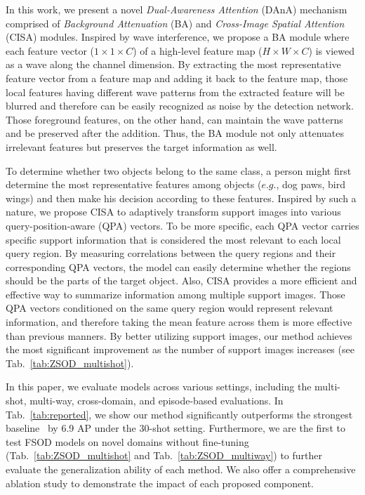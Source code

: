 \documentclass[journal]{IEEEtran}
\begin{document}
In this work, we present a novel \textit{Dual-Awareness Attention} (DAnA) mechanism comprised of \textit{Background Attenuation} (BA) and \textit{Cross-Image Spatial Attention} (CISA) modules.
Inspired by wave interference, we propose a BA module where each feature vector ($1\times 1\times C$) of a high-level feature map ($H\times W\times C$) is viewed as a wave along the channel dimension.
By extracting the most representative feature vector from a feature map and adding it back to the feature map, those local features having different wave patterns from the extracted feature will be blurred and therefore can be easily recognized as noise by the detection network. 
Those foreground features, on the other hand, can maintain the wave patterns and be preserved after the addition.
Thus, the BA module not only attenuates irrelevant features but preserves the target information as well.


To determine whether two objects belong to the same class, a person might first determine the most representative features among objects ($e.g.$, dog paws, bird wings) and then make his decision according to these features.
Inspired by such a nature, we propose CISA to adaptively transform support images into various query-position-aware (QPA) vectors.
To be more specific, each QPA vector carries specific support information that is considered the most relevant to each local query region.
By measuring correlations between the query regions and their corresponding QPA vectors, the model can easily determine whether the regions should be the parts of the target object.
Also, CISA provides a more efficient and effective way to summarize information among multiple support images.
Those QPA vectors conditioned on the same query region would represent relevant information, and therefore taking the mean feature across them is more effective than previous manners.
By better utilizing support images, our method achieves the most significant improvement as the number of support images increases (see Tab.~\ref{tab:ZSOD_multishot}).



In this paper, we evaluate models across various settings, including the multi-shot, multi-way, cross-domain, and episode-based evaluations.  
In Tab.~\ref{tab:reported}, we show our method significantly outperforms the strongest baseline~\cite{xiao2020few} by 6.9 AP under the $30$-shot setting.
Furthermore, we are the first to test FSOD models on novel domains without fine-tuning (Tab.~\ref{tab:ZSOD_multishot} and Tab.~\ref{tab:ZSOD_multiway}) to further evaluate the generalization ability of each method.
We also offer a comprehensive ablation study to demonstrate the impact of each proposed component.
\end{document}
